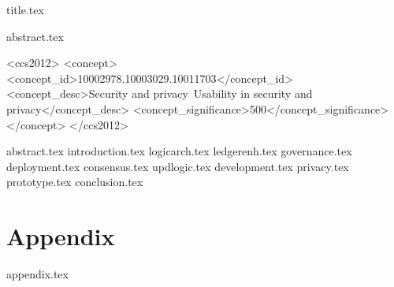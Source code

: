 \documentclass[sigconf, anonymous]{acmart}
\begin{document}
{title.tex}


{abstract.tex}


\begin{CCSXML}
<ccs2012>
<concept>
<concept_id>10002978.10003029.10011703</concept_id>
<concept_desc>Security and privacy~Usability in security and privacy</concept_desc>
<concept_significance>500</concept_significance>
</concept>
</ccs2012>
\end{CCSXML}





{abstract.tex}
{introduction.tex}
{logicarch.tex}
{ledgerenh.tex}
{governance.tex}
{deployment.tex}
{consensus.tex}
{updlogic.tex}
{development.tex}
{privacy.tex}
{prototype.tex}
{conclusion.tex}


\ifshort\else
\appendix
\section*{Appendix}
{appendix.tex}
\fi



\end{document}
